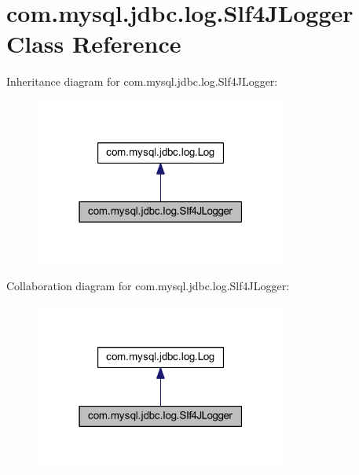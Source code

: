 \hypertarget{classcom_1_1mysql_1_1jdbc_1_1log_1_1_slf4_j_logger}{}\section{com.\+mysql.\+jdbc.\+log.\+Slf4\+J\+Logger Class Reference}
\label{classcom_1_1mysql_1_1jdbc_1_1log_1_1_slf4_j_logger}


Inheritance diagram for com.\+mysql.\+jdbc.\+log.\+Slf4\+J\+Logger\+:
\nopagebreak
\begin{figure}[H]
\begin{center}
\leavevmode
\includegraphics[width=235pt]{classcom_1_1mysql_1_1jdbc_1_1log_1_1_slf4_j_logger__inherit__graph}
\end{center}
\end{figure}


Collaboration diagram for com.\+mysql.\+jdbc.\+log.\+Slf4\+J\+Logger\+:
\nopagebreak
\begin{figure}[H]
\begin{center}
\leavevmode
\includegraphics[width=235pt]{classcom_1_1mysql_1_1jdbc_1_1log_1_1_slf4_j_logger__coll__graph}
\end{center}
\end{figure}
